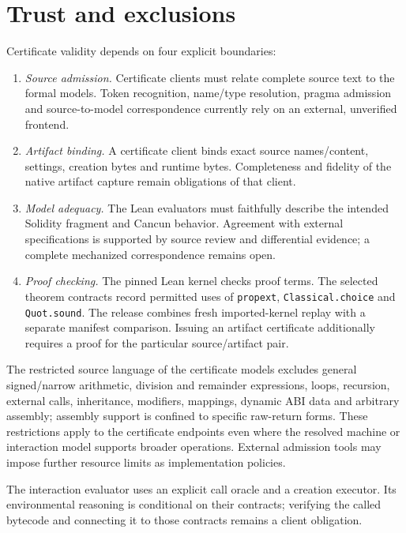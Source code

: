 \documentclass[conference]{IEEEtran}
\newcommand{\code}[1]{\texttt{#1}}
\begin{document}
\section{Trust and exclusions}
\label{sec:trust}
Certificate validity depends on four explicit boundaries:
\begin{enumerate}
\item \emph{Source admission.} Certificate clients must relate complete source
text to the formal models. Token recognition, name/type resolution, pragma
admission and source-to-model correspondence currently rely on an external,
unverified frontend.
\item \emph{Artifact binding.} A certificate client binds exact source names/content,
settings, creation bytes and runtime bytes. Completeness and fidelity of the
native artifact capture remain obligations of that client.
\item \emph{Model adequacy.} The Lean evaluators must faithfully describe the
intended Solidity fragment and Cancun behavior. Agreement with external
specifications is supported by source review and differential evidence;
a complete mechanized correspondence remains open.
\item \emph{Proof checking.} The pinned Lean kernel checks proof terms.
The selected theorem contracts record permitted uses of \code{propext},
\code{Classical.choice} and \code{Quot.sound}. The release combines fresh
imported-kernel replay with a separate manifest comparison. Issuing an artifact
certificate additionally requires a proof for the particular source/artifact pair.
\end{enumerate}

The restricted source language of the certificate models excludes general signed/narrow arithmetic,
division and remainder expressions, loops, recursion, external calls,
inheritance, modifiers, mappings, dynamic ABI data and arbitrary assembly;
assembly support is confined to specific raw-return forms. These restrictions
apply to the certificate endpoints even where the resolved machine or
interaction model supports broader operations. External admission tools may
impose further resource limits as implementation policies.

The interaction evaluator uses an explicit call oracle and a creation executor.
Its environmental reasoning is conditional on their contracts; verifying the
called bytecode and connecting it to those contracts remains a client obligation.
\end{document}
